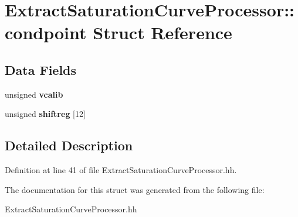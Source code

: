 \section{ExtractSaturationCurveProcessor::condpoint Struct Reference}
\label{structExtractSaturationCurveProcessor_1_1condpoint}
\subsection*{Data Fields}
\begin{DoxyCompactItemize}
\item 
unsigned {\bfseries vcalib}\label{structExtractSaturationCurveProcessor_1_1condpoint_a5afe22b9bd585fbb0c2c9885a131871a}

\item 
unsigned {\bfseries shiftreg} [12]\label{structExtractSaturationCurveProcessor_1_1condpoint_a228d6fdd6a981203ef981dc4f0bdd92b}

\end{DoxyCompactItemize}


\subsection{Detailed Description}


Definition at line 41 of file ExtractSaturationCurveProcessor.hh.

The documentation for this struct was generated from the following file:\begin{DoxyCompactItemize}
\item 
ExtractSaturationCurveProcessor.hh\end{DoxyCompactItemize}
